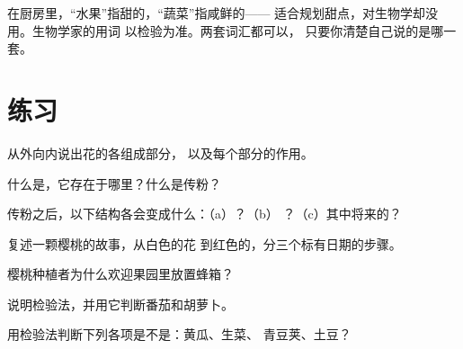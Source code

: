 \begin{remark}\label{rem:g3:flowers-fruits-seeds:words}
在厨房里，“水果”指甜的，“蔬菜”指咸鲜的——
适合规划甜点，对生物学却没用。生物学家的用词
以检验为准。两套词汇都可以，
只要你清楚自己说的是哪一套。
\end{remark}

\section{练习}

\begin{exercise}[$\star$]\label{exo:g3:flowers-fruits-seeds:1}
从外向内说出花的各组成部分，
以及每个部分的作用。
\end{exercise}

\begin{exercise}[$\star$]\label{exo:g3:flowers-fruits-seeds:2}
什么是，它存在于哪里？什么是传粉？
\end{exercise}

\begin{exercise}[$\star$]\label{exo:g3:flowers-fruits-seeds:3}
传粉之后，以下结构各会变成什么：（a）？（b）
？（c）其中将来的？
\end{exercise}

\begin{exercise}[$\star$]\label{exo:g3:flowers-fruits-seeds:4}
复述一颗樱桃的故事，从白色的花
到红色的，分三个标有日期的步骤。
\end{exercise}

\begin{exercise}[$\star$]\label{exo:g3:flowers-fruits-seeds:5}
樱桃种植者为什么欢迎果园里放置蜂箱？
\end{exercise}

\begin{exercise}[$\star$]\label{exo:g3:flowers-fruits-seeds:6}
说明检验法，并用它判断番茄和胡萝卜。
\end{exercise}

\begin{exercise}[$\star$]\label{exo:g3:flowers-fruits-seeds:7}
用检验法判断下列各项是不是：黄瓜、生菜、
青豆荚、土豆？
\end{exercise}

